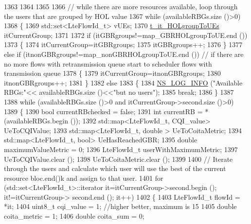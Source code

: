 \begin{DoxyCode}
1363 
1364 
1365 
1366   \textcolor{comment}{// while there are more resources available, loop through the users that are grouped by HOL value}
1367   \textcolor{keywordflow}{while} (availableRBGs.size ()>0)
1368     \{
1369       std::set<LteFlowId\_t> vUEs;
1370       \hyperlink{namespacens3_afe18eb1d0bcd25c77f1dcb8cf7648b32}{t\_it\_HOLgroupToUEs} itCurrentGroup;
1371 
1372       \textcolor{keywordflow}{if} (itGBRgroups!=map\_GBRHOLgroupToUE.end ())
1373         \{
1374           itCurrentGroup=itGBRgroups;
1375           itGBRgroups++;
1376         \}
1377       \textcolor{keywordflow}{else} \textcolor{keywordflow}{if} (itnonGBRgroups!=map\_nonGBRHOLgroupToUE.end ())                  \textcolor{comment}{// if there are no more
       flows with retransmission queue start to scheduler flows with transmission queue}
1378         \{
1379           itCurrentGroup=itnonGBRgroups;
1380           itnonGBRgroups++;
1381         \}
1382       \textcolor{keywordflow}{else}
1383         \{
1384           \hyperlink{group__logging_gafbd73ee2cf9f26b319f49086d8e860fb}{NS\_LOG\_INFO} (\textcolor{stringliteral}{"Available RBGs:"}<< availableRBGs.size ()<<\textcolor{stringliteral}{"but no users"});
1385           \textcolor{keywordflow}{break};
1386         \}
1387 
1388       \textcolor{keywordflow}{while} (availableRBGs.size ()>0 and itCurrentGroup->second.size ()>0)
1389         \{
1390           \textcolor{keywordtype}{bool} currentRBchecked = \textcolor{keyword}{false};
1391           \textcolor{keywordtype}{int} currentRB = *(availableRBGs.begin ());
1392           std::map<LteFlowId\_t, CQI\_value> UeToCQIValue;
1393           std::map<LteFlowId\_t, double > UeToCoitaMetric;
1394           std::map<LteFlowId\_t, bool> UeHasReachedGBR;
1395           \textcolor{keywordtype}{double} maximumValueMetric = 0;
1396           LteFlowId\_t userWithMaximumMetric;
1397           UeToCQIValue.clear ();
1398           UeToCoitaMetric.clear ();
1399 
1400           \textcolor{comment}{// Iterate through the users and calculate which user will use the best of the current resource
       bloc.end()k and assign to that user.}
1401           \textcolor{keywordflow}{for} (std::set<LteFlowId\_t>::iterator it=itCurrentGroup->second.begin (); it!=itCurrentGroup->
      second.end (); it++)
1402             \{
1403               LteFlowId\_t flowId = *it;
1404               uint8\_t cqi\_value = 1;                           \textcolor{comment}{//higher better, maximum is 15}
1405               \textcolor{keywordtype}{double} coita\_metric = 1;
1406               \textcolor{keywordtype}{double} coita\_sum = 0;

\end{DoxyCode}
